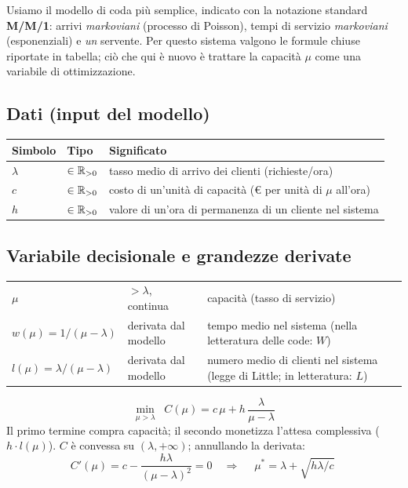 Usiamo il modello di coda più semplice, indicato con la notazione standard
\textbf{M/M/1}: arrivi \emph{markoviani} (processo di Poisson), tempi di servizio
\emph{markoviani} (esponenziali) e \emph{un} servente. Per questo sistema valgono le
formule chiuse riportate in tabella; ciò che qui è nuovo è trattare la capacità
$\mu$ come una variabile di ottimizzazione.

\subsection*{Dati (input del modello)}
\begin{center}\small
\begin{tabular}{llp{7.4cm}}
\toprule
Simbolo & Tipo & Significato \\
\midrule
$\lambda$ & $\in \mathbb{R}_{> 0}$ & tasso medio di arrivo dei clienti (richieste/ora) \\
$c$ & $\in \mathbb{R}_{> 0}$ & costo di un'unità di capacità (\euro{} per unità di $\mu$ all'ora) \\
$h$ & $\in \mathbb{R}_{> 0}$ & valore di un'ora di permanenza di un cliente nel sistema \\
\bottomrule
\end{tabular}
\end{center}

\subsection*{Variabile decisionale e grandezze derivate}
\begin{center}\small
\begin{tabular}{llp{7.4cm}}
\toprule
$\mu$ & $> \lambda$, continua & capacità (tasso di servizio) \\
$w(\mu) = 1/(\mu - \lambda)$ & derivata dal modello & tempo medio nel sistema
  (nella letteratura delle code: $W$) \\
$l(\mu) = \lambda/(\mu - \lambda)$ & derivata dal modello & numero medio di clienti
  nel sistema (legge di Little; in letteratura: $L$) \\
\bottomrule
\end{tabular}
\end{center}

\begin{modello}
\[
\min_{\mu > \lambda}\;\; C(\mu) = c\,\mu + h\,\frac{\lambda}{\mu - \lambda}
\]
Il primo termine compra capacità; il secondo monetizza l'attesa complessiva
($h \cdot l(\mu)$). $C$ è convessa su $(\lambda, +\infty)$; annullando la derivata:
\[
C'(\mu) = c - \frac{h\lambda}{(\mu - \lambda)^2} = 0
\quad\Longrightarrow\quad
\boxed{\;\mu^* = \lambda + \sqrt{h\lambda/c}\;}
\]
\end{modello}

